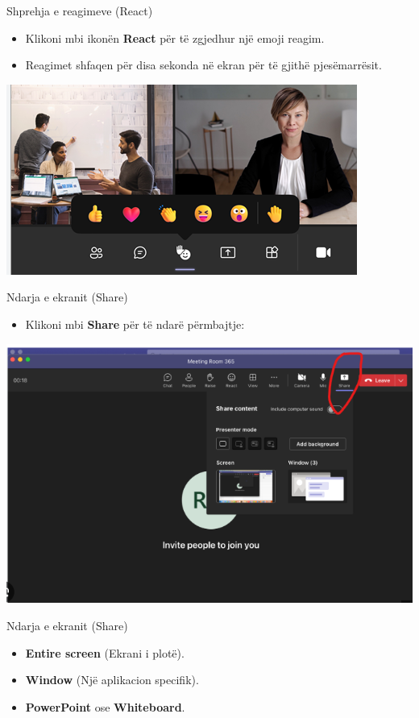 \documentclass[
  ignorenonframetext,
]{beamer}
\providecommand{\tightlist}{%
  \setlength{\itemsep}{0pt}\setlength{\parskip}{0pt}}
\begin{document}
\begin{frame}{Shprehja e reagimeve (React)}
\label{shprehja-e-reagimeve-react}
\begin{itemize}
\item
  Klikoni mbi ikonën \textbf{React} për të zgjedhur një emoji reagim.
\item
  Reagimet shfaqen për disa sekonda në ekran për të gjithë
  pjesëmarrësit.
\end{itemize}

\includegraphics{./images/teams12.png}
\end{frame}

\begin{frame}{Ndarja e ekranit (Share)}
\label{ndarja-e-ekranit-share}
\begin{itemize}
\tightlist
\item
  Klikoni mbi \textbf{Share} për të ndarë përmbajtje:
\end{itemize}

\includegraphics{./images/teams13.png}
\end{frame}

\begin{frame}{Ndarja e ekranit (Share)}
\label{ndarja-e-ekranit-share-1}
\begin{itemize}
\item
  \textbf{Entire screen} (Ekrani i plotë).
\item
  \textbf{Window} (Një aplikacion specifik).
\item
  \textbf{PowerPoint} ose \textbf{Whiteboard}.
\end{itemize}
\end{frame}
\end{document}
